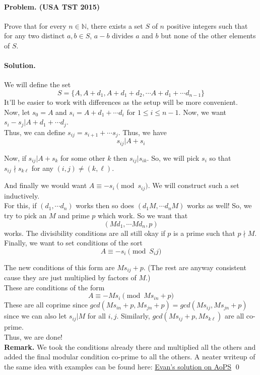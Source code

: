 \documentclass[12pt]{article}
\newenvironment{solution}
{\paragraph{Solution.}}
{\qed\eject}
\begin{document}
\paragraph*{\textbf{Problem. (USA TST 2015)}} Prove that for every $n\in \mathbb N$, there exists a set $S$ of $n$ positive integers such that for any two distinct $a,b\in S$, $a-b$ divides $a$ and $b$ but none of the other elements of $S$.
\begin{solution}
    We will define the set \[S=\{A, A+d_1, A+d_1+d_2,\cdots A+d_1+\cdots d_{n-1}\}\]
    It'll be easier to work with differences as the setup will be more convenient.\\

    Now, let $s_0=A$ and $s_i=A+d_1+\cdots d_i$ for $1\le i\le n-1$. Now, we want $s_i-s_j|A+d_{1}+\cdots d_{j}$.\\

    Thus, we can define $s_{ij}=s_{i+1}+\cdots s_j$. Thus, we have \[s_{ij}|A+s_i\]
    
    Now, if $s_{ij}|A+s_k$ for some other $k$ then $s_{ij}|s_{ik}$. So, we will pick $s_i$ so that $s_{ij}\nmid s_{k\ell}$ for any $(i,j)\ne (k,\ell)$.
    
    And finally we would want $A\equiv -s_i\pmod{s_{ij}}$. We will construct such a set inductively.\\

    For this, if $(d_1,\cdots d_n)$ works then so does $(d_1M,\cdots d_nM)$ works as well! So, we try to pick an $M$ and prime $p$ which work. So we want that \[(Md_1,\cdots Md_n, p)\] works. The divisibility conditions are all still okay if $p$ is a prime such that $p\nmid M$. Finally, we want to set conditions of the sort \[A\equiv -s_i \pmod{S_ij}\]
    
    The new conditions of this form are $Ms_{ij}+p$. (The rest are anyway consistent cause they are just multiplied by factors of $M$.)\\

    These are conditions of the form \[A\equiv -Ms_i \pmod{Ms_{in}+p}\] These are all coprime since $gcd(Ms_{in}+p, Ms_{jn}+p)=gcd(Ms_{ij}, Ms_{jn}+p)$ since we can also let $s_{ij}|M$ for all $i,j$. Similarly, $gcd(Ms_{ij}+p, Ms_{k\ell})$ are all co-prime.\\

    Thus, we are done!\\

    \textbf{Remark.} We took the conditions already there and multiplied all the others and added the final modular condition co-prime to all the others. A neater writeup of the same idea with examples can be found here: \href{https://artofproblemsolving.com/community/c6h617855p3683199}{Evan's solution on AoPS}
\end{solution}
\end{document}
